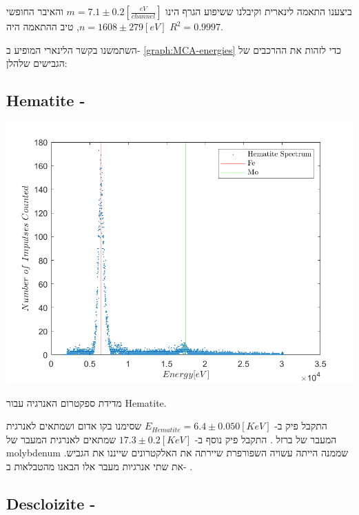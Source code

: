 \documentclass{article}
\begin{document}
ביצענו התאמה לינארית וקיבלנו ששיפוע הגרף הינו 
$m = 7.1 \pm 0.2 [\frac{eV}{channel}]$
והאיבר החופשי 
$n = 1608 \pm 279 [eV]$,
טיב ההתאמה היה 
$R^2 = 0.9997$.

השתמשנו בקשר הלינארי המופיע ב-
\ref{graph:MCA-energies}
כדי לזהות את ההרכבים של הגבישים שלהלן:


\begin{english}
\subsection{Hematite - }
\end{english}

\begin{graph}[ht]
\centering
\includegraphics[width=\textwidth]{Hamamit.png}
\caption{
מדידת ספקטרום האנרגיה עבור 
\textenglish{Hematite}.
}
\label{graph:Hamatit-spec}
\end{graph}

התקבל פיק ב-
$E_{Hematite} = 6.4 \pm 0.050 [KeV]$
שסימנו בקו אדום ושמתאים לאנרגית המעבר של ברזל
.
התקבל פיק נוסף ב-
$17.3 \pm 0.2 [KeV]$
שמתאים לאנרגית המעבר של
\textenglish{molybdenum}
שממנה הייתה עשויה השפורפרת שיירתה את האלקטרונים שייננו את הגביש.
את שתי אנרגיות מעבר אלו הבאנו מהטבלאות ב-
\cite{xrayBooklet}.

\begin{english}
\subsection{Descloizite - }
\end{english}
\end{document}
